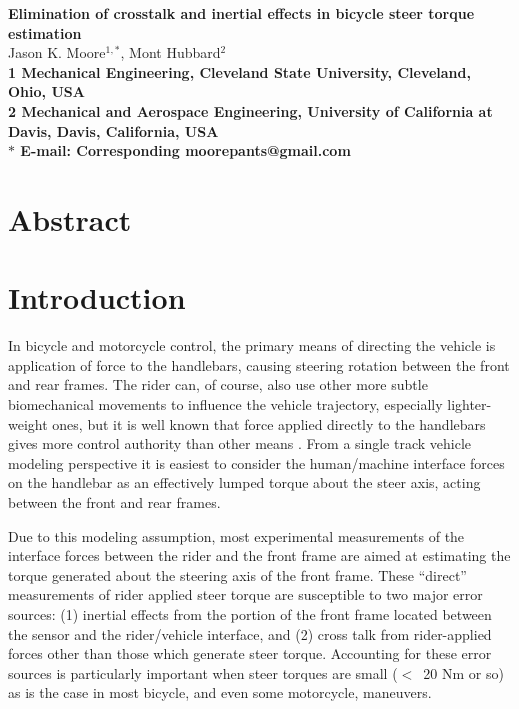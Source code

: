 \documentclass[10pt]{article}
\begin{document}
\begin{flushleft}
  {\Large
  \textbf{Elimination of crosstalk and inertial effects in bicycle steer torque
    estimation}
  }
  \\
  Jason K. Moore$^{1,\ast}$,
  Mont Hubbard$^{2}$
  \\
  \bf{1} Mechanical Engineering, Cleveland State University, Cleveland, Ohio, USA
  \\
  \bf{2} Mechanical and Aerospace Engineering, University of California at Davis, Davis, California, USA
  \\
  $\ast$ E-mail: Corresponding moorepants@gmail.com
\end{flushleft}

\section*{Abstract}


\section*{Introduction}

In bicycle and motorcycle control, the primary means of directing the vehicle
is application of force to the handlebars, causing steering rotation between
the front and rear frames. The rider can, of course, also use other more subtle
biomechanical movements to influence the vehicle trajectory, especially
lighter-weight ones, but it is well known that force applied directly to the
handlebars gives more control authority than other means
\cite{Weir1972,Aoki1979,Sharp2007,Sharp2008a}. From a single track vehicle
modeling perspective it is easiest to consider the human/machine interface
forces on the handlebar as an effectively lumped torque about the steer axis,
acting between the front and rear frames.

Due to this modeling assumption, most experimental measurements of the
interface forces between the rider and the front frame are aimed at estimating
the torque generated about the steering axis of the front frame. These
``direct'' measurements of rider applied steer torque are susceptible to two
major error sources: (1) inertial effects from the portion of the front frame
located between the sensor and the rider/vehicle interface, and (2) cross talk
from rider-applied forces other than those which generate steer torque.
Accounting for these error sources is particularly important when steer torques
are small ($<$~20 Nm or so) as is the case in most bicycle, and even some
motorcycle, maneuvers.
\end{document}
